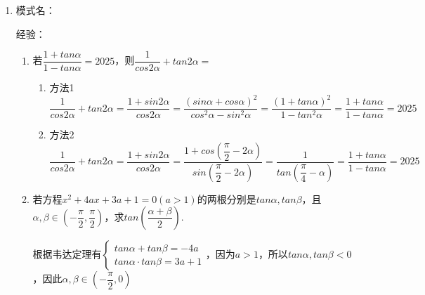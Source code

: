 \begin{enumerate}
\begin{enumerate}
\begin{jieda}
             $\alpha \in (0, \dfrac{\pi}{4})$，故$\alpha - \beta \in (-\pi, -\dfrac{\pi}{4})$，故$\alpha - \beta$是固定的角，因此$2\alpha - \beta$不存在多解，$2\alpha - \beta \in (-\pi, 0)$ \\
            $tan(2\alpha - \beta) = tan(\alpha + \alpha - \beta) = \dfrac{tan\alpha + tan(\alpha-\beta)}{1-tan\alpha \cdot tan(\alpha - \beta)} = 1$，故$2\alpha - \beta = -\dfrac{3\pi}{4}$
        \end{jieda}
    \end{enumerate}
    \item 
    模式名：

    经验：
    \begin{enumerate}
        \item 若$\dfrac{1+tan\alpha}{1-tan\alpha} = 2025$，则$\dfrac{1}{cos2\alpha} + tan2\alpha = $
        \begin{jieda}
            \begin{enumerate}
                \item 方法1 \\
                $\dfrac{1}{cos2\alpha} + tan2\alpha = \dfrac{1+sin2\alpha}{cos2\alpha} = \dfrac{(sin\alpha+cos\alpha)^2}{cos^2\alpha - sin^2\alpha} = \dfrac{(1+tan\alpha)^2}{1 - tan^2\alpha} = \dfrac{1+tan\alpha}{1-tan\alpha} = 2025$
                \item 方法2 \\
                $\dfrac{1}{cos2\alpha} + tan2\alpha = \dfrac{1+sin2\alpha}{cos2\alpha} = \dfrac{1+cos(\dfrac{\pi}{2} - 2\alpha)}{sin(\dfrac{\pi}{2} - 2\alpha)} = \dfrac{1}{tan(\dfrac{\pi}{4} - \alpha)} = \dfrac{1+tan\alpha}{1-tan\alpha} = 2025$
            \end{enumerate}
        \end{jieda}
        \item 若方程$x^2+4ax+3a+1 = 0 (a>1)$的两根分别是$tan\alpha, tan\beta$，且$\alpha, \beta \in (-\dfrac{\pi}{2}, \dfrac{\pi}{2})$，求$tan\left(\dfrac{\alpha+\beta}{2}\right)$.
        \begin{jieda}
            根据韦达定理有$\left \{ \begin{array}{l}
                 tan\alpha + tan\beta = -4a  \\
                 tan\alpha \cdot tan\beta = 3a+1 
            \end{array}\right.$，因为$a > 1$，所以$tan\alpha, tan\beta < 0$，因此$\alpha, \beta \in (-\dfrac{\pi}{2}, 0)$ \\

\end{jieda}
\end{enumerate}
\end{enumerate}

